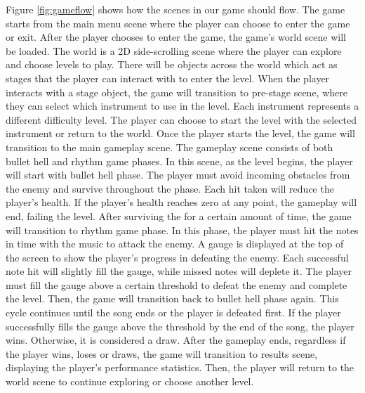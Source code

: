 Figure \ref{fig:gameflow} shows how the scenes in our game should flow.
The game starts from the main menu scene where the player can choose to enter the game or exit.
After the player chooses to enter the game, the game's world scene will be loaded.
The world is a 2D side-scrolling scene where the player can explore and choose levels to play.
There will be objects across the world which act as stages that the player can interact with to 
enter the level.
When the player interacts with a stage object, the game will transition to pre-stage scene, where 
they can select which instrument to use in the level.
Each instrument represents a different difficulty level.
The player can choose to start the level with the selected instrument or return to the world.
Once the player starts the level, the game will transition to the main gameplay scene.
The gameplay scene consists of both bullet hell and rhythm game phases.
In this scene, as the level begins, the player will start with bullet hell phase.
The player must avoid incoming obstacles from the enemy and survive throughout the phase.
Each hit taken will reduce the player's health.
If the player's health reaches zero at any point, the gameplay will end, failing the level.
After surviving the for a certain amount of time, the game will transition to rhythm game phase.
In this phase, the player must hit the notes in time with the music to attack the enemy.
A gauge is displayed at the top of the screen to show the player's progress in defeating the enemy.
Each successful note hit will slightly fill the gauge, while missed notes will deplete it.
The player must fill the gauge above a certain threshold to defeat the enemy and complete the level.
Then, the game will transition back to bullet hell phase again.
This cycle continues until the song ends or the player is defeated first.
If the player successfully fills the gauge above the threshold by the end of the song, the player wins.
Otherwise, it is considered a draw.
After the gameplay ends, regardless if the player wins, loses or draws, the game will transition to results 
scene, displaying the player's performance statistics.
Then, the player will return to the world scene to continue exploring or choose another level.